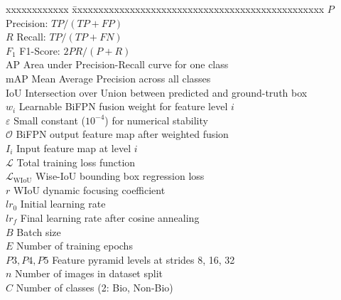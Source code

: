 \documentclass[BTech]{audiss}
\begin{document}
\begin{singlespace}
\begin{tabbing}
xxxxxxxxxxxx \= xxxxxxxxxxxxxxxxxxxxxxxxxxxxxxxxxxxxxxxxxxxxxxxx \kill
\textbf{$P$}              \> Precision: $TP / (TP + FP)$ \\
\textbf{$R$}              \> Recall: $TP / (TP + FN)$ \\
\textbf{$F_1$}            \> F1-Score: $2PR / (P + R)$ \\
\textbf{$\text{AP}$}      \> Area under Precision-Recall curve for one class \\
\textbf{$\text{mAP}$}     \> Mean Average Precision across all classes \\
\textbf{$\text{IoU}$}     \> Intersection over Union between predicted and ground-truth box \\
\textbf{$w_i$}            \> Learnable BiFPN fusion weight for feature level $i$ \\
\textbf{$\varepsilon$}    \> Small constant ($10^{-4}$) for numerical stability \\
\textbf{$\mathcal{O}$}    \> BiFPN output feature map after weighted fusion \\
\textbf{$I_i$}            \> Input feature map at level $i$ \\
\textbf{$\mathcal{L}$}    \> Total training loss function \\
\textbf{$\mathcal{L}_{\text{WIoU}}$} \> Wise-IoU bounding box regression loss \\
\textbf{$r$}              \> WIoU dynamic focusing coefficient \\
\textbf{$lr_0$}           \> Initial learning rate \\
\textbf{$lr_f$}           \> Final learning rate after cosine annealing \\
\textbf{$B$}              \> Batch size \\
\textbf{$E$}              \> Number of training epochs \\
\textbf{$P3, P4, P5$}     \> Feature pyramid levels at strides 8, 16, 32 \\
\textbf{$n$}              \> Number of images in dataset split \\
\textbf{$C$}              \> Number of classes (2: Bio, Non-Bio) \\
\end{tabbing}
\end{singlespace}

\pagebreak
\clearpage
{}











\begin{singlespace}
\nocite{*}


\end{singlespace}
\end{document}
